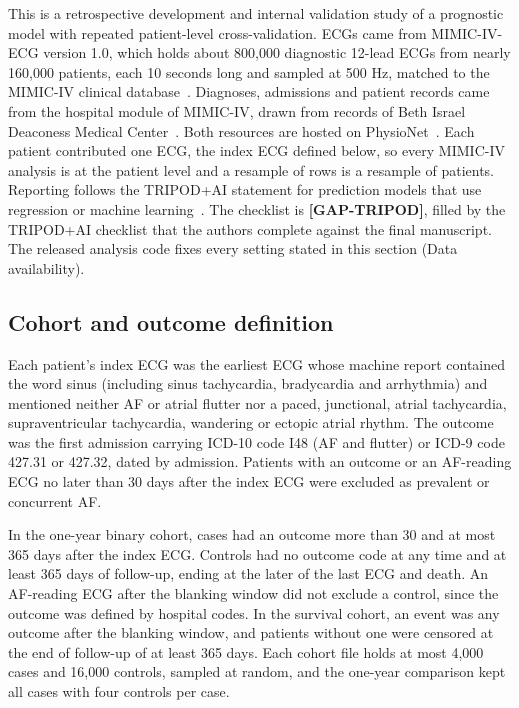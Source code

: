 \documentclass[preprint,12pt]{elsarticle}
\begin{document}
This is a retrospective development and internal validation study of a prognostic model with repeated patient-level cross-validation. ECGs came from MIMIC-IV-ECG version 1.0, which holds about 800,000 diagnostic 12-lead ECGs from nearly 160,000 patients, each 10 seconds long and sampled at 500 Hz, matched to the MIMIC-IV clinical database~\cite{gow2023}. Diagnoses, admissions and patient records came from the hospital module of MIMIC-IV, drawn from records of Beth Israel Deaconess Medical Center~\cite{johnson2023}. Both resources are hosted on PhysioNet~\cite{goldberger2000}. Each patient contributed one ECG, the index ECG defined below, so every MIMIC-IV analysis is at the patient level and a resample of rows is a resample of patients. Reporting follows the TRIPOD+AI statement for prediction models that use regression or machine learning~\cite{collins2024}. The checklist is \textbf{[GAP-TRIPOD]}, filled by the TRIPOD+AI checklist that the authors complete against the final manuscript. The released analysis code fixes every setting stated in this section (Data availability).

\subsection{Cohort and outcome definition}

Each patient's index ECG was the earliest ECG whose machine report contained the word sinus (including sinus tachycardia, bradycardia and arrhythmia) and mentioned neither AF or atrial flutter nor a paced, junctional, atrial tachycardia, supraventricular tachycardia, wandering or ectopic atrial rhythm. The outcome was the first admission carrying ICD-10 code I48 (AF and flutter) or ICD-9 code 427.31 or 427.32, dated by admission. Patients with an outcome or an AF-reading ECG no later than 30 days after the index ECG were excluded as prevalent or concurrent AF.

In the one-year binary cohort, cases had an outcome more than 30 and at most 365 days after the index ECG. Controls had no outcome code at any time and at least 365 days of follow-up, ending at the later of the last ECG and death. An AF-reading ECG after the blanking window did not exclude a control, since the outcome was defined by hospital codes. In the survival cohort, an event was any outcome after the blanking window, and patients without one were censored at the end of follow-up of at least 365 days. Each cohort file holds at most 4,000 cases and 16,000 controls, sampled at random, and the one-year comparison kept all cases with four controls per case.
\end{document}
